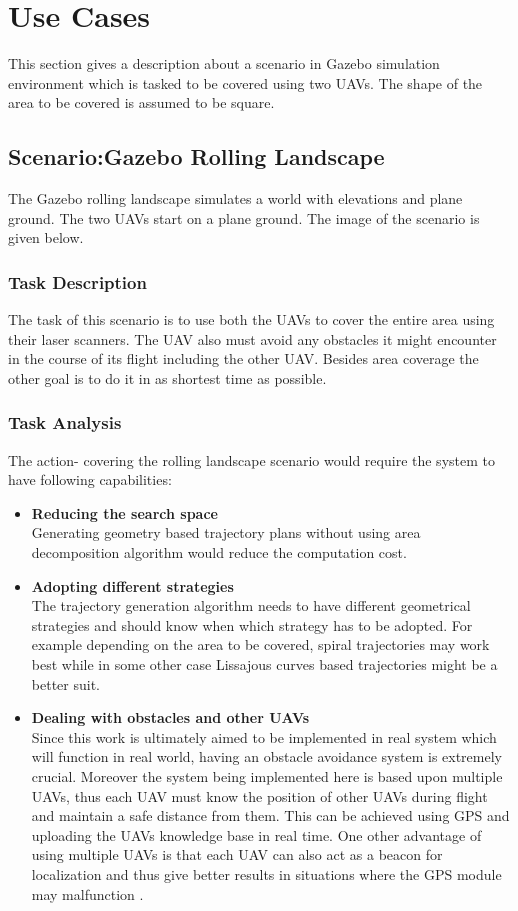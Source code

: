 \section{Use Cases}
\label{sec:scenario}
This section gives a description about a scenario in Gazebo simulation environment which is tasked to be covered using two UAVs. The shape of the area to be covered is assumed to be square.\\

\subsection{Scenario:Gazebo Rolling Landscape}
The Gazebo rolling landscape simulates a world with elevations and plane ground. The two UAVs start on a plane ground. The image of the scenario is given below.
\subsubsection{Task Description}
The task of this scenario is to use both the UAVs to cover the entire area using their laser scanners. The UAV also must avoid any obstacles it might encounter in the course of its flight including the other UAV. Besides area coverage the other goal is to do it in as shortest time as possible. 
\subsubsection{Task Analysis}
The action- covering the rolling landscape scenario would require the system to have following capabilities:
\begin{itemize}
 \item \textbf{Reducing the search space}\\ 
 Generating geometry based trajectory plans without using area decomposition algorithm would reduce the computation cost. 
 \item \textbf{Adopting different strategies}\\
 The trajectory generation algorithm needs to have different geometrical strategies and should know when which strategy has to be adopted. For example depending on the area to be covered, spiral trajectories may work best while in some other case Lissajous curves based trajectories might be a better suit.
  \item \textbf{Dealing with obstacles and other UAVs}\\
 Since this work is ultimately aimed to be implemented in real system which will function in real world, having an obstacle avoidance system is extremely crucial. Moreover the system being implemented here is based upon multiple UAVs, thus each UAV must know the position of other UAVs during flight and maintain a safe distance from them. This can be achieved using GPS and uploading the UAVs knowledge base in real time. One other advantage of using multiple UAVs is that each UAV can also act as a beacon for localization and thus give better results in situations where the GPS module may malfunction \cite{3,8,18}  .\\
\end{itemize}

